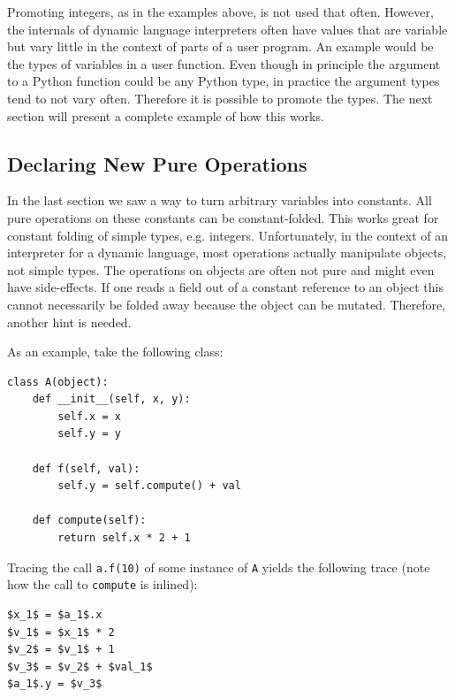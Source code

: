\documentclass{sigplanconf}
\begin{document}
Promoting integers, as in the examples above, is not used that often.
However, the internals of dynamic language interpreters often
have values that are variable but vary little in the context of parts of a user
program. An example would be the types of variables in a user function. Even
though in principle the argument to a Python function could be any Python type,
in practice the argument types tend to not vary often. Therefore it is possible to
promote the types. The next section will present a complete example of how
this works.


\subsection{Declaring New Pure Operations}

In the last section we saw a way to turn arbitrary variables into constants. All
pure operations on these constants can be constant-folded. This works great for
constant folding of simple types, e.g. integers. Unfortunately, in the context of an
interpreter for a dynamic
language, most operations actually manipulate objects, not simple types. The
operations on objects are often not pure and might even have side-effects. If
one reads a field out of a constant reference to an object this cannot
necessarily be folded away because the object can be mutated. Therefore, another
hint is needed.

As an example, take the following class:

\begin{lstlisting}[mathescape,basicstyle=\ttfamily]
class A(object):
    def __init__(self, x, y):
        self.x = x
        self.y = y

    def f(self, val):
        self.y = self.compute() + val

    def compute(self):
        return self.x * 2 + 1
\end{lstlisting}

Tracing the call \texttt{a.f(10)} of some instance of \texttt{A} yields the following
trace (note how the call to \texttt{compute} is inlined):
%
\begin{lstlisting}[mathescape,basicstyle=\ttfamily]
$x_1$ = $a_1$.x
$v_1$ = $x_1$ * 2
$v_2$ = $v_1$ + 1
$v_3$ = $v_2$ + $val_1$
$a_1$.y = $v_3$
\end{lstlisting}
\end{document}
